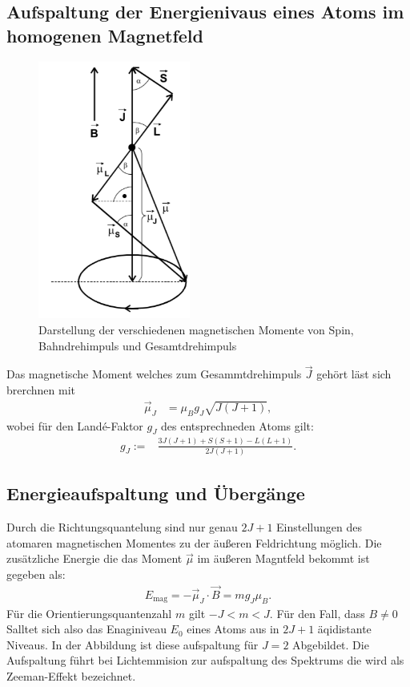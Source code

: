 \subsection{Aufspaltung der Energienivaus eines Atoms im homogenen Magnetfeld}
%
\begin{figure}[h!]
  \centering
  \includegraphics[width=5cm]{magmom1.png}
  \caption{Darstellung der verschiedenen magnetischen Momente von Spin, Bahndrehimpuls und Gesamtdrehimpuls}
  \label{fig:mag}
\end{figure}

Das magnetische Moment welches zum Gesammtdrehimpuls $\vec{J}$ gehört läst sich brerchnen mit
\begin{align*}
  \vec{\mu}_J&=\mu_Bg_J\sqrt{J(J+1)},
\end{align*}
wobei für den Landé-Faktor $g_J$ des entsprechneden Atoms gilt:
\begin{align}
		g_J:=&\frac{3J(J+1)+S(S+1)-L(L+1)}{2J(J+1)}.
\end{align}
\FloatBarrier

\subsection{Energieaufspaltung und Übergänge}
Durch die Richtungsquantelung sind nur genau $2J+1$ Einstellungen des atomaren magnetischen Momentes zu der äußeren Feldrichtung möglich.
Die zusätzliche Energie die das Moment $\vec{\mu}$ im äußeren Magntfeld bekommt ist gegeben als:
\begin{align*}
  E_{\text{mag}} = -\vec{\mu}_J \cdot \vec{B} = mg_J\mu_B.
\end{align*}
Für die Orientierungsquantenzahl $m$ gilt $-J < m < J$.
Für den Fall, dass $B \ne 0$ Salltet sich also das Enaginiveau $E_0$ eines Atoms aus in $2J+1$ äqidistante Niveaus.
In der Abbildung %
ist diese aufspaltung für $J = 2$ Abgebildet.
Die Aufspaltung führt bei Lichtemmision zur aufspaltung des Spektrums die wird als Zeeman-Effekt bezeichnet.

